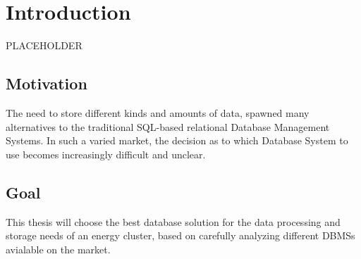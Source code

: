 \chapter{Introduction}
\label{ch:intro}
PLACEHOLDER

%
%
\section{Motivation}
\label{sec:intro:motivation}
The need to store different kinds and amounts of data, spawned many alternatives to the traditional SQL-based relational Database Management Systems. In such a varied market, the decision as to which Database System to use becomes increasingly difficult and unclear. 
%
%
\section{Goal}
\label{sec:intro:goal}
This thesis will choose the best database solution for the data processing and storage needs of an energy cluster, based on carefully analyzing different DBMSs avialable on the market.

%
%

